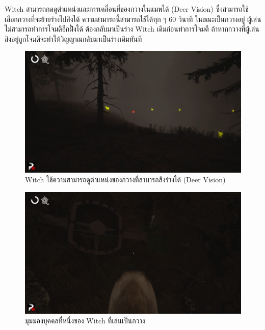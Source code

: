 Witch สามารถกดดูตำแหน่งและการเคลื่อนที่ของกวางในแมพได้ (Deer Vision) ซึ่งสามารถใช้เลือกกวางที่จะย้ายร่างไปสิงได้
ความสามารถนี้สามารถใช้ได้ทุก ๆ 60 วินาที ในขณะเป็นกวางอยู่ ผู้เล่นไม่สามารถทำการโจมตีอีกฝั่งได้
ต้องกลับมาเป็นร่าง Witch เดิมก่อนทำการโจมตี ถ้าหากกวางที่ผู้เล่นสิงอยู่ถูกโจมตีจะทำให้วิญญาณกลับมาเป็นร่างเดิมทันที

\begin{figure}[p]
  \begin{center}
  \includegraphics[width=\textwidth]{./img/mechanics/deervision.png}
  \end{center}
    \caption[Witch ใช้ความสามารถดูตำแหน่งของกวางที่สามารถสิงร่างได้ (Deer Vision)]{Witch ใช้ความสามารถดูตำแหน่งของกวางที่สามารถสิงร่างได้ (Deer Vision)}
    \label{Witch ใช้ความสามารถดูตำแหน่งของกวางที่สามารถสิงร่างได้ (Deer Vision)}
\end{figure}

\begin{figure}[p]
  \begin{center}
  \includegraphics[width=\textwidth]{./img/mechanics/witch_deer.png}
  \end{center}
    \caption[มุมมองบุคคลที่หนึ่งของ Witch ที่เล่นเป็นกวาง]{มุมมองบุคคลที่หนึ่งของ Witch ที่เล่นเป็นกวาง}
    \label{มุมมองบุคคลที่หนึ่งของ Witch ที่เล่นเป็นกวาง}
\end{figure}


